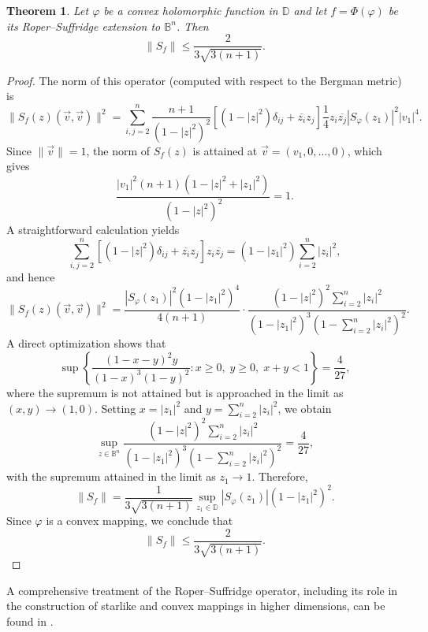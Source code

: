 \documentclass[12pt]{amsart}
\newtheorem{theorem}{Theorem}[section]
\theoremstyle{definition}
\theoremstyle{remark}
\numberwithin{equation}{section}
\begin{document}
\begin{theorem}
Let $\varphi$ be a convex holomorphic function in $\mathbb{D}$ and let
$f = \Phi(\varphi)$ be its Roper--Suffridge extension to $\mathbb{B}^n$.
Then
\[
\|S_f\| \leq \frac{2}{3\sqrt{3(n+1)}}.
\]
\end{theorem}
\begin{proof}
The norm of this operator (computed with respect to the Bergman metric) is
\[
\|S_f(z)(\vec{v},\vec{v})\|^2
=\sum_{i,j=2}^n\frac{n+1}{(1-|z|^2)^2}
\left[(1-|z|^2)\delta_{ij}+\overline{z_i}z_j\right]
\frac{1}{4}z_i\overline{z_j}|S_\varphi(z_1)|^2|v_1|^4.
\]
Since $\|\vec{v}\|=1$, the norm of $S_f(z)$ is attained at
$\vec{v}=(v_1,0,\ldots,0)$, which gives
\[
\frac{|v_1|^2(n+1)(1-|z|^2+|z_1|^2)}{(1-|z|^2)^2}=1.
\]
A straightforward calculation yields
\[
\sum_{i,j=2}^n\left[(1-|z|^2)\delta_{ij}+\overline{z_i}z_j\right]z_i\overline{z_j}
=(1-|z_1|^2)\sum_{i=2}^n|z_i|^2,
\]
and hence
\[
\|S_f(z)(\vec{v},\vec{v})\|^2
=\frac{|S_\varphi(z_1)|^2(1-|z_1|^2)^4}{4(n+1)}
\cdot\frac{(1-|z|^2)^2\displaystyle\sum_{i=2}^n|z_i|^2}
{(1-|z_1|^2)^3\!\left(1-\displaystyle\sum_{i=2}^n|z_i|^2\right)^{\!2}}.
\]
A direct optimization shows that
\[
\sup\left\{\frac{(1-x-y)^2y}{(1-x)^3(1-y)^2}
:x\geq 0,\;y\geq 0,\;x+y<1\right\}=\frac{4}{27},
\]
where the supremum is not attained but is approached in the limit as
$(x,y)\to(1,0)$.
Setting $x=|z_1|^2$ and $y=\sum_{i=2}^n|z_i|^2$, we obtain
\[
\sup_{z\in\mathbb{B}^n}
\frac{(1-|z|^2)^2\displaystyle\sum_{i=2}^n|z_i|^2}
{(1-|z_1|^2)^3\!\left(1-\displaystyle\sum_{i=2}^n|z_i|^2\right)^{\!2}}
=\frac{4}{27},
\]
with the supremum attained in the limit as $z_1\to 1$. Therefore,
\[
\|S_f\|=\frac{1}{3\sqrt{3(n+1)}}
\sup_{z_1\in\mathbb{D}}|S_\varphi(z_1)|(1-|z_1|^2)^2.
\]
Since $\varphi$ is a convex mapping, we conclude that
\[
\|S_f\| \leq \frac{2}{3\sqrt{3(n+1)}}.
\]

\end{proof}

A comprehensive treatment of the Roper--Suffridge operator, including its
role in the construction of starlike and convex mappings in higher dimensions,
can be found in \cite[Ch.~11]{graham_kohr2003}.





\end{document}
